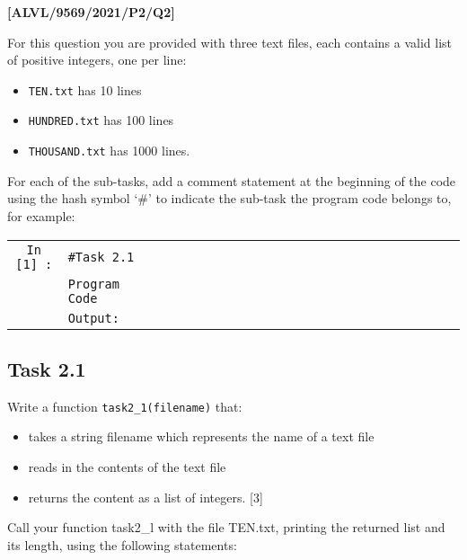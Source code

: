 \item \textbf{{[}ALVL/9569/2021/P2/Q2{]} }

For this question you are provided with three text files, each contains
a valid list of positive integers, one per line:
\begin{itemize}
\item \texttt{TEN.txt} has 10 lines
\item \texttt{HUNDRED.txt} has 100 lines
\item \texttt{THOUSAND.txt} has 1000 lines.
\end{itemize}
For each of the sub-tasks, add a comment statement at the beginning
of the code using the hash symbol \textquoteleft \#' to indicate the
sub-task the program code belongs to, for example:

\begin{singlespace}
\noindent \texttt{}%
\begin{tabular}{c|lcccccccccccccccccccccc|}
\cline{2-24} \cline{3-24} \cline{4-24} \cline{5-24} \cline{6-24} \cline{7-24} \cline{8-24} \cline{9-24} \cline{10-24} \cline{11-24} \cline{12-24} \cline{13-24} \cline{14-24} \cline{15-24} \cline{16-24} \cline{17-24} \cline{18-24} \cline{19-24} \cline{20-24} \cline{21-24} \cline{22-24} \cline{23-24} \cline{24-24} 
\texttt{In {[}1{]} :} & \texttt{\#Task 2.1} &  &  &  &  &  &  &  &  &  &  &  &  &  &  &  &  &  &  &  &  &  & \tabularnewline
 & \texttt{Program Code} &  &  &  &  &  &  &  &  &  &  &  &  &  &  &  &  &  &  &  &  &  & \tabularnewline
\cline{2-24} \cline{3-24} \cline{4-24} \cline{5-24} \cline{6-24} \cline{7-24} \cline{8-24} \cline{9-24} \cline{10-24} \cline{11-24} \cline{12-24} \cline{13-24} \cline{14-24} \cline{15-24} \cline{16-24} \cline{17-24} \cline{18-24} \cline{19-24} \cline{20-24} \cline{21-24} \cline{22-24} \cline{23-24} \cline{24-24} 
\multicolumn{1}{c}{} & \texttt{Output:} &  &  &  &  &  &  &  &  &  &  &  &  &  &  &  &  &  &  &  &  &  & \multicolumn{1}{c}{}\tabularnewline
\end{tabular}
\end{singlespace}

\subsection*{Task 2.1 }

Write a function \texttt{task2\_1(filename)} that: 
\begin{itemize}
\item takes a string filename which represents the name of a text file 
\item reads in the contents of the text file 
\item returns the content as a list of integers. \hfill{}{[}3{]} 
\end{itemize}
Call your function task2\_l with the file TEN.txt, printing the returned
list and its length, using the following statements:

